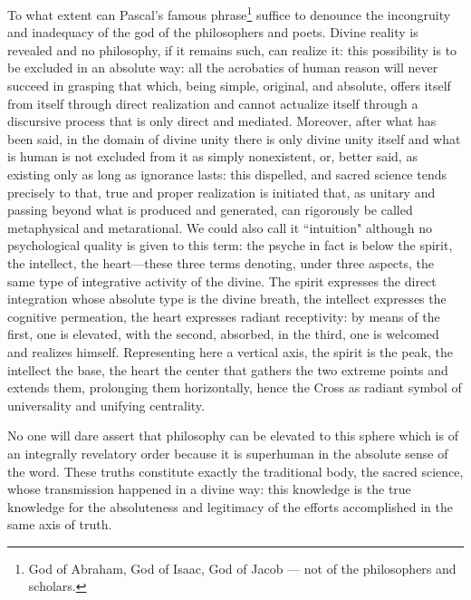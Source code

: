 To what extent can Pascal's famous phrase\footnote{God of Abraham, God of Isaac, God of Jacob — not of the philosophers and scholars.} suffice to denounce the incongruity and inadequacy of the god of the philosophers and poets. Divine reality is revealed and no philosophy, if it remains such, can realize it: this possibility is to be excluded in an absolute way: all the acrobatics of human reason will never succeed in grasping that which, being simple, original, and absolute, offers itself from itself through direct realization and cannot actualize itself through a discursive process that is only direct and mediated. Moreover, after what has been said, in the domain of divine unity there is only divine unity itself and what is human is not excluded from it as simply nonexistent, or, better said, as existing only as long as ignorance lasts: this dispelled, and sacred science tends precisely to that, true and proper realization is initiated that, as unitary and passing beyond what is produced and generated, can rigorously be called metaphysical and metarational. We could also call it ``intuition" although no psychological quality is given to this term: the psyche in fact is below the spirit, the intellect, the heart—these three terms denoting, under three aspects, the same type of integrative activity of the divine. The spirit expresses the direct integration whose absolute type is the divine breath, the intellect expresses the cognitive permeation, the heart expresses radiant receptivity: by means of the first, one is elevated, with the second, absorbed, in the third, one is welcomed and realizes himself. Representing here a vertical axis, the spirit is the peak, the intellect the base, the heart the center that gathers the two extreme points and extends them, prolonging them horizontally, hence the Cross as radiant symbol of universality and unifying centrality.

No one will dare assert that philosophy can be elevated to this sphere which is of an integrally revelatory order because it is superhuman in the absolute sense of the word. These truths constitute exactly the traditional body, the sacred science, whose transmission happened in a divine way: this knowledge is the true knowledge for the absoluteness and legitimacy of the efforts accomplished in the same axis of truth.

